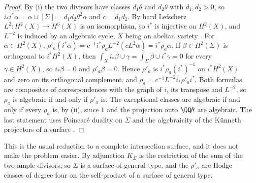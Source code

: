 \begin{proof}
By (i) the two divisors have classes $d_{1}\theta$
and $d_{2}\theta$ with $d_{1},d_{2}>0$, so $i_{*}i^{*}\alpha=\alpha\cup
[\Sigma]=d_{1}d_{2}\theta^{2}\alpha$ and $c=d_{1}d_{2}$. By hard Lefschetz
$L^{2}\colon H^{2}(X)\to H^{6}(X)$ is an isomorphism, so $i^{*}$ is injective
on $H^{2}(X)$, and $L^{-2}$ is induced by an algebraic cycle, $X$ being an
abelian variety \cite[\S2]{Kle68}. For $\alpha\in H^{2}(X)$,
$\rho'_{a}(i^{*}\alpha)=c^{-1}i^{*}\rho_{a}L^{-2}(cL^{2}\alpha)=
i^{*}\rho_{a}\alpha$. If $\beta\in H^{2}(\Sigma)$ is orthogonal to
$i^{*}H^{2}(X)$, then $\int_{X}i_{*}\beta\cup\gamma=\int_{\Sigma}\beta\cup
i^{*}\gamma=0$ for every $\gamma\in H^{2}(X)$, so $i_{*}\beta=0$ and
$\rho'_{a}\beta=0$. Hence $\rho'_{a}$ is $i^{*}\rho_{a}(i^{*})^{-1}$ on
$i^{*}H^{2}(X)$ and zero on its orthogonal complement, and
$\rho_{a}=c^{-1}L^{-2}i_{*}\rho'_{a}i^{*}$. Both formulas are composites of
correspondences with the graph of $i$, its transpose and $L^{-2}$, so
$\rho_{a}$ is algebraic if and only if $\rho'_{a}$ is. The exceptional classes
are algebraic if and only if every $\rho_{a}$ is, by
(ii), since $1$ and the projection onto $\QQ\theta$ are
algebraic. The last statement uses Poincar\'e duality on $\Sigma$ and the
algebraicity of the K\"unneth projectors of a surface \cite{Mur90}.
\end{proof}

This is the usual reduction to a complete intersection surface, and it does
not make the problem easier. By adjunction $K_{\Sigma}$ is the restriction of
the sum of the two ample divisors, so $\Sigma$ is a surface of general type,
and the $\rho'_{a}$ are Hodge classes of degree four on the self-product of
a surface of general type.

